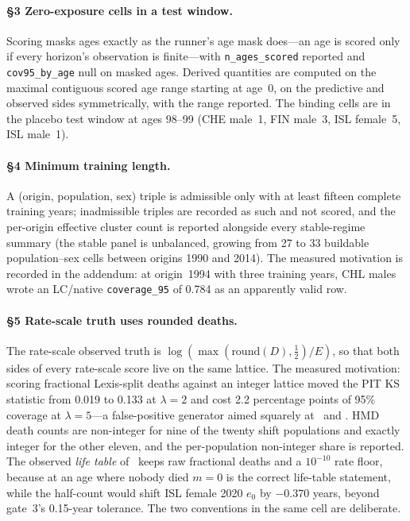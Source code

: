 \paragraph{\S3 Zero-exposure cells in a test window.} Scoring masks ages
exactly as the runner's age mask does---an age is scored only if every
horizon's observation is finite---with \texttt{n\_ages\_scored} reported and
\texttt{cov95\_by\_age} null on masked ages. Derived quantities are computed
on the maximal contiguous scored age range starting at age~0, on the
predictive and observed sides symmetrically, with the range reported. The
binding cells are in the placebo test window at ages 98--99 (CHE male~1, FIN
male~3, ISL female~5, ISL male~1).

\paragraph{\S4 Minimum training length.} A (origin, population, sex) triple is
admissible only with at least fifteen complete training years; inadmissible
triples are recorded as such and not scored, and the per-origin effective
cluster count is reported alongside every stable-regime summary (the stable
panel is unbalanced, growing from 27 to 33 buildable population--sex cells
between origins 1990 and 2014). The measured motivation is recorded in the
addendum: at origin~1994 with three training years, CHL males wrote an
LC/native \texttt{coverage\_95} of 0.784 as an apparently valid row.

\paragraph{\S5 Rate-scale truth uses rounded deaths.} The rate-scale observed
truth is $\log(\max(\text{round}(D),\tfrac12)/E)$, so that both sides of every
rate-scale score live on the same lattice. The measured motivation: scoring
fractional Lexis-split deaths against an integer lattice moved the PIT KS
statistic from 0.019 to 0.133 at $\lambda=2$ and cost 2.2 percentage points of
95\% coverage at $\lambda=5$---a false-positive generator aimed squarely at
\Htwo\ and \Hfour. HMD death counts are non-integer for nine of the twenty
shift populations and exactly integer for the other eleven, and the
per-population non-integer share is reported. The observed \emph{life table}
of \Hfive\ keeps raw fractional deaths and a $10^{-10}$ rate floor, because at
an age where nobody died $m=0$ is the correct life-table statement, while the
half-count would shift ISL female 2020 $e_0$ by $-0.370$ years, beyond
gate~3's 0.15-year tolerance. The two conventions in the same cell are
deliberate.

